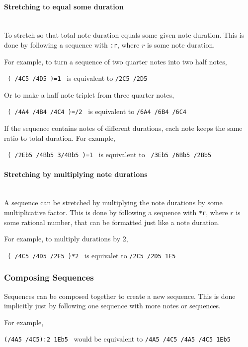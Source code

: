 \documentclass{scrartcl}
\begin{document}
\paragraph{Stretching to equal some duration}~\\
To stretch so that total note duration equals some given note duration. This is done by following a sequence with \verb|:r|, where $r$ is some note duration.

For example, to turn a sequence of two quarter notes into two half notes,
\begin{center}
\verb| ( /4C5 /4D5 )=1| \ is equivalent to \verb|/2C5 /2D5|
\end{center}

Or to make a half note triplet from three quarter notes,
\begin{center}
\verb| ( /4A4 /4B4 /4C4 )=/2| \ is equivalent to \verb|/6A4 /6B4 /6C4|
\end{center}

If the sequence contains notes of different durations, each note keeps the same ratio to total duration. For example,
\begin{center}
\verb| ( /2Eb5 /4Bb5 3/4Bb5 )=1| \ is equivalent to \verb| /3Eb5 /6Bb5 /2Bb5|
\end{center}

\paragraph{Stretching by multiplying note durations}~\\
A sequence can be stretched by multiplying the note durations by some multiplicative factor. This is done by following a sequence with \verb|*r|, where $r$ is some rational number, that can be formatted just like a note duration.

For example, to multiply durations by 2,
\begin{center}
\verb| ( /4C5 /4D5 /2E5 )*2| \ is equivalet to \verb|/2C5 /2D5 1E5|
\end{center}

\subsubsection{Composing Sequences}
Sequences can be composed together to create a new sequence. This is done implicitly just by following one sequence with more notes or sequences. 

For example, 
\begin{center}
\verb|(/4A5 /4C5):2 1Eb5| \ would be equivalent to \verb|/4A5 /4C5 /4A5 /4C5 1Eb5|
\end{center}
\end{document}
